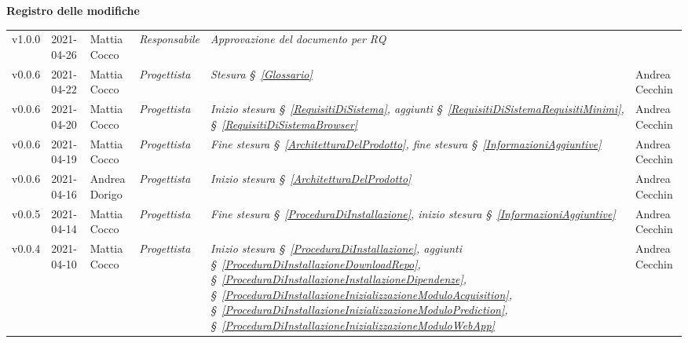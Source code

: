 \quad
\begin{center}
	\LARGE\textbf{Registro delle modifiche}
\end{center}
\def\tabularxcolumn#1{m{#1}}
{

\begin{center}
	\renewcommand{\arraystretch}{1.4}
	\begin{longtable}[c]{|p{2cm-1\tabcolsep}|p{2cm}|p{3cm-2\tabcolsep}|p{3cm-1.5\tabcolsep}|p{}|p{4cm-2\tabcolsep}|}
		\hline
		\rowcolor{airforceblue}
		\makecell[c]{\textbf{Versione}} & \makecell[c]{\textbf{Data}} & \makecell[c]{\textbf{Autore}} & \makecell[c]{\textbf{Ruolo}} & \makecell[c]{\textbf{Modifica}} &  \makecell[c]{\textbf{Verificatore}}\\
		\hline
		\centering v1.0.0 & 2021-04-26 & Mattia Cocco & \centering \textit{Responsabile} & \textit{Approvazione del documento per RQ}  & \makecell[c]{-}\\
		\hline
		\hline
		\centering v0.0.6 & 2021-04-22 & Mattia Cocco & \centering \textit{Progettista} & \textit{Stesura \S~\ref{Glossario}} & Andrea Cecchin\\
		\hline
		\hline
		\centering v0.0.6 & 2021-04-20 & Mattia Cocco & \centering \textit{Progettista} & \textit{Inizio stesura \S~\ref{RequisitiDiSistema}, aggiunti \S~\ref{RequisitiDiSistemaRequisitiMinimi}, \S~\ref{RequisitiDiSistemaBrowser}} & Andrea Cecchin\\
		\hline
		\hline
		\centering v0.0.6 & 2021-04-19 & Mattia Cocco & \centering \textit{Progettista} & \textit{Fine stesura \S~\ref{ArchitetturaDelProdotto}, fine stesura \S~\ref{InformazioniAggiuntive}} & Andrea Cecchin\\
		\hline
		\hline
		\centering v0.0.6 & 2021-04-16 & Andrea Dorigo & \centering \textit{Progettista} & \textit{Inizio stesura \S~\ref{ArchitetturaDelProdotto}} & Andrea Cecchin\\
		\hline
		\hline
		\centering v0.0.5 & 2021-04-14 & Mattia Cocco & \centering \textit{Progettista} & \textit{Fine stesura \S~\ref{ProceduraDiInstallazione}, inizio stesura \S~\ref{InformazioniAggiuntive}} & Andrea Cecchin \\
		\hline
		\hline
		\centering v0.0.4 & 2021-04-10 & Mattia Cocco & \centering \textit{Progettista} & \textit{Inizio stesura \S~\ref{ProceduraDiInstallazione}, aggiunti
		\S~\ref{ProceduraDiInstallazioneDownloadRepo}, \S~\ref{ProceduraDiInstallazioneInstallazioneDipendenze},
		\S~\ref{ProceduraDiInstallazioneInizializzazioneModuloAcquisition}, \S~\ref{ProceduraDiInstallazioneInizializzazioneModuloPrediction}, \S~\ref{ProceduraDiInstallazioneInizializzazioneModuloWebApp}} & Andrea Cecchin \\

\end{longtable}
\end{center}}

